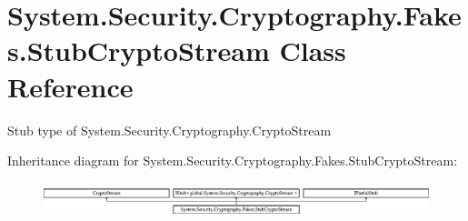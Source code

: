 \hypertarget{class_system_1_1_security_1_1_cryptography_1_1_fakes_1_1_stub_crypto_stream}{\section{System.\-Security.\-Cryptography.\-Fakes.\-Stub\-Crypto\-Stream Class Reference}
\label{class_system_1_1_security_1_1_cryptography_1_1_fakes_1_1_stub_crypto_stream}
}


Stub type of System.\-Security.\-Cryptography.\-Crypto\-Stream 


Inheritance diagram for System.\-Security.\-Cryptography.\-Fakes.\-Stub\-Crypto\-Stream\-:\begin{figure}[H]
\begin{center}
\leavevmode
\includegraphics[height=1.025641cm]{class_system_1_1_security_1_1_cryptography_1_1_fakes_1_1_stub_crypto_stream}
\end{center}
\end{figure}

